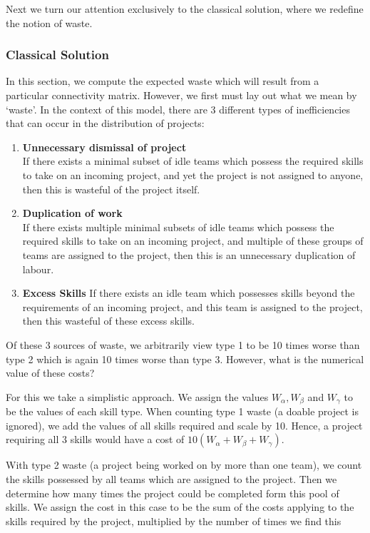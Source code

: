  Next we turn our attention exclusively to the classical solution, where we redefine the notion of waste.

\subsubsection{Classical Solution}

In this section, we compute the expected waste which will result from a particular connectivity matrix. However, we first must lay out what we mean by `waste'. In the context of this model, there are 3 different types of inefficiencies that can occur in the distribution of projects:

\begin{enumerate}
	\item \textbf{Unnecessary dismissal of project}\\
	If there exists a minimal subset of idle teams which possess the required skills to take on an incoming project, and yet the project is not assigned to anyone, then this is wasteful of the project itself.
	
	\item \textbf{Duplication of work}\\
	If there exists multiple minimal subsets of idle teams which possess the required skills to take on an incoming project, and multiple of these groups of teams are assigned to the project, then this is an unnecessary duplication of labour.
	
	\item \textbf{Excess Skills}
	If there exists an idle team which possesses skills beyond the requirements of an incoming project, and this team is assigned to the project, then this wasteful of these excess skills.
\end{enumerate}

Of these 3 sources of waste, we arbitrarily view type 1 to be 10 times worse than type 2 which is again 10 times worse than type 3. However, what is the numerical value of these costs?

For this we take a simplistic approach. We assign the values $W_\alpha, W_\beta$ and $W_\gamma$ to be the values of each skill type. When counting type 1 waste (a doable project is ignored), we add the values of all skills required and scale by 10. Hence, a project requiring all 3 skills would have a cost of $10(W_\alpha+W_\beta+W_\gamma)$.

With type 2 waste (a project being worked on by more than one team), we count the skills possessed by all teams which are assigned to the project. Then we determine how many times the project could be completed form this pool of skills. We assign the cost in this case to be the sum of the costs applying to the skills required by the project, multiplied by the number of times we find this 

